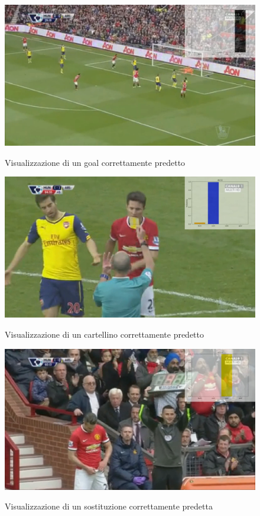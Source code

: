 \begin{figure}[ht]
\centering
\caption{Visualizzazione di un goal correttamente predetto}
\includegraphics[width=\linewidth]{img/videogoal.png}
\label{figure : videogoal}
\end{figure}
\begin{figure}[H]
\centering
\caption{Visualizzazione di un cartellino correttamente predetto}
\includegraphics[width=\linewidth]{img/videocard.png}
\label{figure : videocard}
\end{figure}
\begin{figure}[H]
\centering
\caption{Visualizzazione di un sostituzione correttamente predetta}
\includegraphics[width=\linewidth]{img/videosubs.png}
\label{figure : videosub}
\end{figure}
